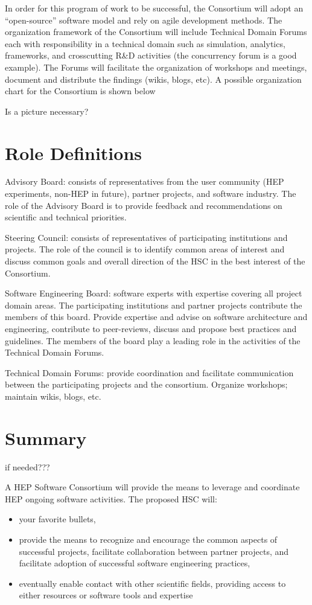 \documentclass[12pt,letterpaper,fleqn]{article}
\begin{document}
In order for this program of work to be successful, the Consortium
will adopt an “open-source” software model and rely on agile
development methods.  The organization framework of the Consortium
will include Technical Domain Forums each with responsibility in a
technical domain such as simulation, analytics, frameworks, and
crosscutting R\&D activities (the concurrency forum is a good example).
The Forums will facilitate the organization of workshops and meetings,
document and distribute the findings (wikis, blogs, etc).   A
possible organization chart for the Consortium is shown below

Is a picture necessary?

\section{Role Definitions}

Advisory Board: consists of representatives from the user community
(HEP experiments, non-HEP in future), partner projects, and software
industry.  The role of the Advisory Board is to provide feedback
and recommendations on scientific and technical priorities.

Steering Council: consists of representatives of participating
institutions and projects.  The role of the council is to identify
common areas of interest and discuss common goals and overall
direction of the HSC in the best interest of the Consortium.

Software Engineering Board: software experts with expertise covering
all project domain areas. The participating institutions and partner
projects contribute the members of this board.  Provide expertise
and advise on software architecture and engineering, contribute to
peer-reviews, discuss and propose best practices and guidelines.
The members of the board play a leading role in the activities of
the Technical Domain Forums.

Technical Domain Forums: provide coordination and facilitate
communication between the participating projects and the consortium.
Organize workshops; maintain wikis, blogs, etc.


\section{Summary} 
if needed???

A HEP Software Consortium will provide the means to leverage and
coordinate HEP ongoing software activities.  The proposed HSC will:
\begin{itemize}
\item your favorite bullets,
\item provide the means to recognize and encourage the common aspects
of successful projects, facilitate collaboration between partner
projects, and facilitate adoption of successful software engineering
practices,
\item eventually enable contact with other scientific fields,
providing access to either resources or software tools and expertise
\end{itemize}



\newpage

%
%
\end{document}
